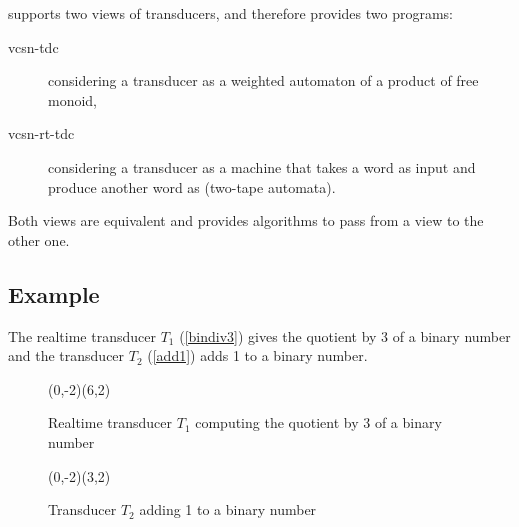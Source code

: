 \Vauc supports two views of transducers, and therefore provides two
programs:
\begin{description}
\item[vcsn-tdc] considering a transducer as a weighted automaton of a
  product of free monoid,
\item[vcsn-rt-tdc] considering a transducer as a machine that takes a
  word as input and produce another word as (two-tape automata).
\end{description}
Both views are equivalent and \Vauc provides algorithms to pass from a
view to the other one.

\subsection{Example}

The realtime transducer $T_1$ (\autoref{bindiv3}) gives the quotient
by 3 of a binary number and the transducer $T_2$ (\autoref{add1}) adds
1 to a binary number.


\begin{figure}[h]
  \begin{center}
    \begin{VCPicture}{(0,-2)(6,2)}
        
    \end{VCPicture}
    \caption{Realtime transducer $T_1$ computing the quotient by 3 of a binary number}
    \label{bindiv3}
  \end{center}
\end{figure}

\begin{figure}[h]
  \begin{center}
    \begin{VCPicture}{(0,-2)(3,2)}
       
    \end{VCPicture}
    \caption{Transducer $T_2$ adding 1 to a binary number}
    \label{add1}
  \end{center}
\end{figure}

